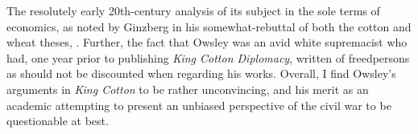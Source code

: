 The resolutely early 20th-century analysis of its subject in the sole terms of economics, as noted by Ginzberg in his somewhat-rebuttal of both the cotton and wheat theses\footnotemark,  \Autocite{ginzbergeconomicsbritish1936}. Further, the fact that Owsley was an avid white supremacist who had, one year prior to publishing \emph{King Cotton Diplomacy}, written of freedpersons as \Autocite[62]{owsleyIrrepressibleConflict1930} should not be discounted when regarding his works. Overall, I find Owsley's arguments in \textit{King Cotton} to be rather unconvincing, and his merit as an academic attempting to present an unbiased perspective of the civil war to be questionable at best.

